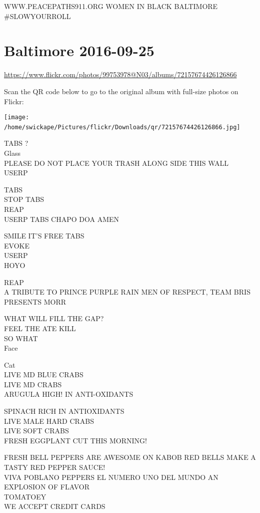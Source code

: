 \documentclass[10pt,letterpaper]{article}
\begin{document}
WWW.PEACEPATHS911.ORG WOMEN IN BLACK BALTIMORE\\
\#SLOWYOURROLL
\

\section*{Baltimore 2016-09-25}

\url{https://www.flickr.com/photos/99753978@N03/albums/72157674426126866}

Scan the QR code below to go to the original album with full-size photos on Flickr:

\texttt{[image: /home/swickape/Pictures/flickr/Downloads/qr/72157674426126866.jpg]}
\

TABS ?\\
Glass\\
PLEASE DO NOT PLACE YOUR TRASH ALONG SIDE THIS WALL\\
USERP

TABS\\
STOP TABS\\
REAP\\
USERP TABS CHAPO DOA AMEN

SMILE IT'S FREE TABS\\
EVOKE\\
USERP\\
HOYO

REAP\\
A TRIBUTE TO PRINCE PURPLE RAIN MEN OF RESPECT, TEAM BRIS PRESENTS MORR

WHAT WILL FILL THE GAP?\\
FEEL THE ATE KILL\\
SO WHAT\\
Face

Cat\\
LIVE MD BLUE CRABS\\
LIVE MD CRABS\\
ARUGULA HIGH! IN ANTI{-}OXIDANTS

SPINACH RICH IN ANTIOXIDANTS\\
LIVE MALE HARD CRABS\\
LIVE SOFT CRABS\\
FRESH EGGPLANT CUT THIS MORNING!

FRESH BELL PEPPERS ARE AWESOME ON KABOB RED BELLS MAKE A TASTY RED PEPPER SAUCE!\\
VIVA POBLANO PEPPERS EL NUMERO UNO DEL MUNDO AN EXPLOSION OF FLAVOR\\
TOMATOEY\\
WE ACCEPT CREDIT CARDS
\end{document}
